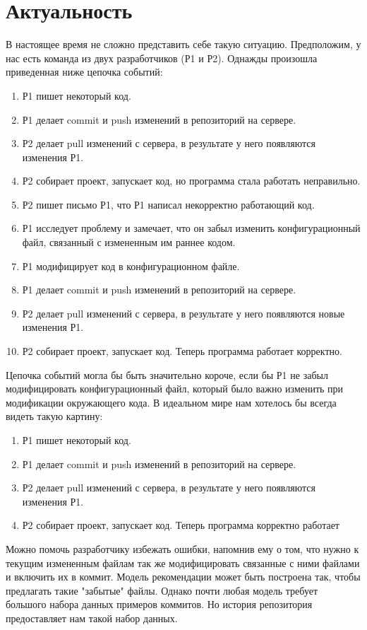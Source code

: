 \documentclass[times]{itmo-student-thesis}
\begin{document}
\section{Актуальность}
В настоящее время не сложно представить себе такую ситуацию. Предположим, у нас есть команда из двух разработчиков (Р1 и Р2). Однажды произошла приведенная ниже цепочка событий:
    \begin{enumerate}
		\item Р1 пишет некоторый код.
		\item Р1 делает commit и push изменений в репозиторий на сервере.
		\item Р2 делает pull изменений с сервера, в результате у него появляются изменения Р1.
		\item Р2 собирает проект, запускает код, но программа стала работать неправильно.
		\item Р2 пишет письмо Р1, что Р1 написал некорректно работающий код. 
		\item Р1 исследует проблему и замечает, что он забыл изменить конфигурационный файл, связанный с измененным им раннее кодом.
		\item Р1 модифицирует код в конфигурационном файле.
		\item Р1 делает commit и push изменений в репозиторий на сервере.
		\item Р2 делает pull изменений с сервера, в результате у него появляются новые изменения Р1.
		\item Р2 собирает проект, запускает код. Теперь программа работает корректно.
	\end{enumerate}
Цепочка событий могла бы быть значительно короче, если бы Р1 не забыл модифицировать конфигурационный файл, который было важно изменить при модификации окружающего кода. В идеальном мире нам хотелось бы всегда видеть такую картину:
    \begin{enumerate}
		\item Р1 пишет некоторый код.
		\item Р1 делает commit и push изменений в репозиторий на сервере.
		\item Р2 делает pull изменений с сервера, в результате у него появляются изменения Р1.
		\item Р2 собирает проект, запускает код. Теперь программа корректно работает
	\end{enumerate}
Можно помочь разработчику избежать ошибки, напомнив ему о том, что нужно к текущим измененным файлам так же модифицировать связанные с ними файлами и включить их в коммит. Модель рекомендации может быть построена так, чтобы предлагать такие "забытые" файлы. Однако почти любая модель требует большого набора данных примеров коммитов. Но история репозитория предоставляет нам такой набор данных.
\end{document}
